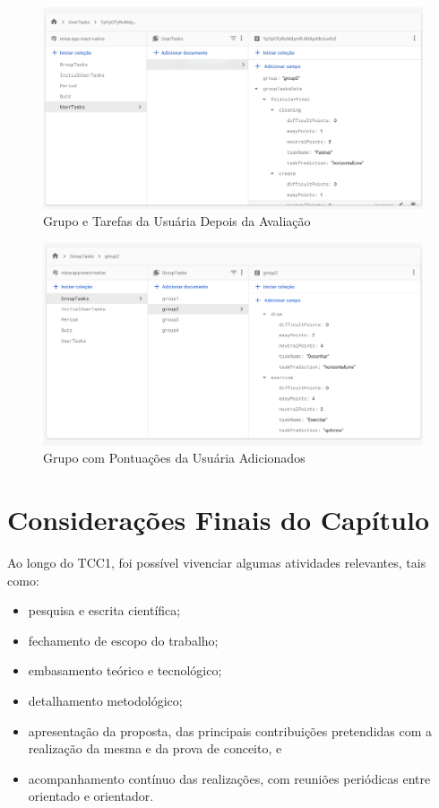 \begin{figure}[ht]
	\caption{Grupo e Tarefas da Usuária Depois da Avaliação}
	\begin{center}
	\includegraphics[keepaspectratio=true,scale=0.37]{figuras/db4.jpeg}
	\end{center}
    \label{fig24}
\end{figure}

\begin{figure}[ht]
	\caption{Grupo com Pontuações da Usuária Adicionados}
	\begin{center}
	\includegraphics[keepaspectratio=true,scale=0.37]{figuras/db3.png}
	\end{center}
    \label{fig25}
\end{figure}


\section{Considerações Finais do Capítulo}

Ao longo do TCC1, foi possível vivenciar algumas atividades relevantes, tais como:

\begin{itemize}
    \item pesquisa e escrita científica;
    \item fechamento de escopo do trabalho;
    \item embasamento teórico e tecnológico;
    \item detalhamento metodológico;
    \item apresentação da proposta, das principais contribuições pretendidas com a realização da mesma e da prova de conceito, e
    \item acompanhamento contínuo das realizações, com reuniões periódicas entre orientado e orientador.
\end{itemize}

